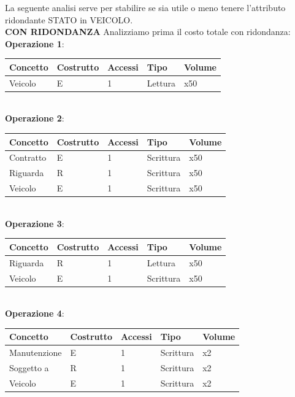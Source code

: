 \documentclass[10pt,a4paper]{article}
\begin{document}
\noindent
La seguente analisi serve per stabilire se sia utile o meno tenere l’attributo ridondante
STATO in VEICOLO.\\
\textbf{CON RIDONDANZA} Analizziamo prima il costo totale con ridondanza:\\
\textbf{Operazione 1}:
\begin{table} [h!]
\centering
\begin{tabular}{|p{2cm}|p{2cm}|p{2cm}|p{2cm}|p{1.5cm}|}
\hline
\textbf{Concetto} & \textbf{Costrutto} & \textbf{Accessi} & \textbf{Tipo} & \textbf{Volume} \\
\hline
Veicolo & E & 1 & Lettura & x50 \\
\hline
\end{tabular}
\end{table}
\\
\textbf{Operazione 2}:
\begin{table} [h!]
\centering
\begin{tabular}{|p{2cm}|p{2cm}|p{2cm}|p{2cm}|p{1.5cm}|}
\hline
\textbf{Concetto} & \textbf{Costrutto} & \textbf{Accessi} & \textbf{Tipo} & \textbf{Volume} \\
\hline
Contratto & E & 1 & Scrittura & x50 \\
\hline
Riguarda & R & 1 & Scrittura & x50 \\
\hline
Veicolo & E & 1 & Scrittura & x50 \\
\hline
\end{tabular}
\end{table}
\\
\textbf{Operazione 3}:
\begin{table} [h!]
\centering
\begin{tabular}{|p{2cm}|p{2cm}|p{2cm}|p{2cm}|p{1.5cm}|}
\hline
\textbf{Concetto} & \textbf{Costrutto} & \textbf{Accessi} & \textbf{Tipo} & \textbf{Volume} \\
\hline
Riguarda & R & 1 & Lettura & x50 \\
\hline
Veicolo & E & 1 & Scrittura & x50 \\
\hline
\end{tabular}
\end{table}
\\
\textbf{Operazione 4}:
\begin{table} [H]
\centering
\begin{tabular}{|p{2cm}|p{2cm}|p{2cm}|p{2cm}|p{1.5cm}|}
\hline
\textbf{Concetto} & \textbf{Costrutto} & \textbf{Accessi} & \textbf{Tipo} & \textbf{Volume} \\
\hline
Manutenzione & E & 1 & Scrittura & x2 \\
\hline
Soggetto a & R & 1 & Scrittura & x2 \\
\hline
Veicolo & E & 1 & Scrittura & x2 \\
\hline
\end{tabular}
\end{table}
\end{document}
